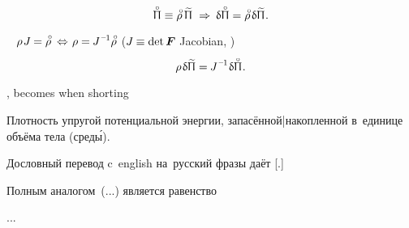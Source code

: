 \nopagebreak\vspace{-0.2em}
\begin{equation}\label{elasticpotentialenergydensityofundeformed:nonlinearmomentless}
\initialpotentialenergydensity \equiv \initialmassdensity \hspace{.4ex} \potentialenergypermassunit
\hspace{.7ex} \Rightarrow \hspace{.5ex}
\variation{\initialpotentialenergydensity} = \initialmassdensity \hspace{.25ex} \variation{\potentialenergypermassunit}
\hspace{.1ex} .
\end{equation}

\vspace{-0.4em}\noindent
{}~
${\massdensity \hspace{.2ex} \Jacobian \hspace{-0.1ex} = \initialmassdensity
\hspace{.5ex} \Leftrightarrow \hspace{.2ex}
\massdensity = \hspace{-0.1ex} \inverseJacobian \initialmassdensity}$
(${J \hspace{-0.1ex} \equiv \operatorname{det} \bm{F}\hspace{-0.12ex}}$\ru{\:---}
Jacobian,
)

\nopagebreak\vspace{-0.2em}\begin{equation*}
\massdensity \hspace{.2ex} \variation{\potentialenergypermassunit} = \hspace{-0.1ex} \inverseJacobian \hspace{.1ex} \variation{\initialpotentialenergydensity}
\hspace{.1ex} .
\end{equation*}


{\small
\setlength{\parindent}{0pt}

\begin{leftverticalbar}%

,
becomes when shorting

\begin{otherlanguage}{russian}
Плотность
упругой потенциальной энергии,
запасённой|накопленной
в~единице объёма тела (сред\'{ы}).
\end{otherlanguage}

\begin{otherlanguage}{russian}
Дословный перевод
c~english на~русский
фразы
даёт
[.]
\end{otherlanguage}

\end{leftverticalbar}
\par}


\begin{otherlanguage}{russian}

\vspace{-0.25em}
Полным аналогом~(...) является равенство

...

\end{otherlanguage}
